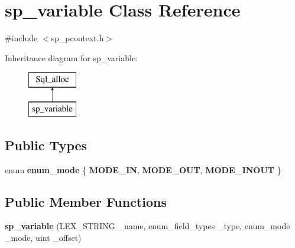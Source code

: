 \hypertarget{classsp__variable}{}\section{sp\+\_\+variable Class Reference}
\label{classsp__variable}


{\ttfamily \#include $<$sp\+\_\+pcontext.\+h$>$}

Inheritance diagram for sp\+\_\+variable\+:\begin{figure}[H]
\begin{center}
\leavevmode
\includegraphics[height=2.000000cm]{classsp__variable}
\end{center}
\end{figure}
\subsection*{Public Types}
\begin{DoxyCompactItemize}
\item 
\mbox{\label{classsp__variable_a56d4818528315e22e65f849fb78c0a23}} 
enum {\bfseries enum\+\_\+mode} \{ {\bfseries M\+O\+D\+E\+\_\+\+IN}, 
{\bfseries M\+O\+D\+E\+\_\+\+O\+UT}, 
{\bfseries M\+O\+D\+E\+\_\+\+I\+N\+O\+UT}
 \}
\end{DoxyCompactItemize}
\subsection*{Public Member Functions}
\begin{DoxyCompactItemize}
\item 
\mbox{\label{classsp__variable_a89004cd2dbfb7472d2386876f15980ca}} 
{\bfseries sp\+\_\+variable} (L\+E\+X\+\_\+\+S\+T\+R\+I\+NG \+\_\+name, enum\+\_\+field\+\_\+types \+\_\+type, enum\+\_\+mode \+\_\+mode, uint \+\_\+offset)
\end{DoxyCompactItemize}
